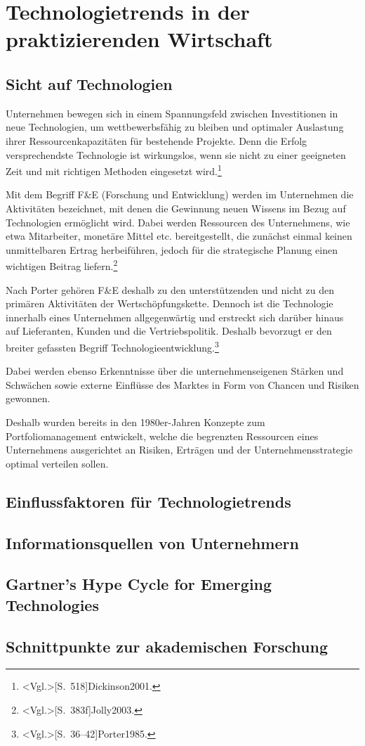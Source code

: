 \section{Technologietrends in der praktizierenden Wirtschaft}


\subsection{Sicht auf Technologien}
Unternehmen bewegen sich in einem Spannungsfeld zwischen Investitionen in neue Technologien, um wettbewerbsfähig zu bleiben und optimaler Auslastung ihrer Ressourcenkapazitäten für bestehende Projekte. Denn die Erfolg versprechendste Technologie ist wirkungslos, wenn sie nicht zu einer geeigneten Zeit und mit richtigen Methoden eingesetzt wird.\footnote{\citeNP<Vgl.>[S.~518]{Dickinson2001}.}

Mit dem Begriff F\&E (Forschung und Entwicklung) werden im Unternehmen die Aktivitäten bezeichnet, mit denen die Gewinnung neuen Wissens im Bezug auf Technologien ermöglicht wird. Dabei werden Ressourcen des Unternehmens, wie etwa Mitarbeiter, monetäre Mittel etc. bereitgestellt, die zunächst einmal keinen unmittelbaren Ertrag herbeiführen, jedoch für die strategische Planung einen wichtigen Beitrag liefern.\footnote{\citeNP<Vgl.>[S.~383f]{Jolly2003}.} 

Nach Porter gehören F\&E deshalb zu den unterstützenden und nicht zu den primären Aktivitäten der Wertschöpfungskette. Dennoch ist die Technologie innerhalb eines Unternehmen allgegenwärtig und erstreckt sich darüber hinaus auf Lieferanten, Kunden und die Vertriebspolitik. Deshalb bevorzugt er den breiter gefassten Begriff Technologieentwicklung.\footnote{\citeNP<Vgl.>[S.~36--42]{Porter1985}.}

Dabei werden ebenso Erkenntnisse über die unternehmenseigenen Stärken und Schwächen sowie externe Einflüsse des Marktes in Form von Chancen und Risiken gewonnen.


Deshalb wurden bereits in den 1980er-Jahren Konzepte zum Portfoliomanagement entwickelt, welche die begrenzten Ressourcen eines Unternehmens ausgerichtet an Risiken, Erträgen und der Unternehmensstrategie optimal verteilen sollen.

\subsection{Einflussfaktoren für Technologietrends}
\subsection{Informationsquellen von Unternehmern}
\subsection{Gartner’s Hype Cycle for Emerging Technologies}
\subsection{Schnittpunkte zur akademischen Forschung}